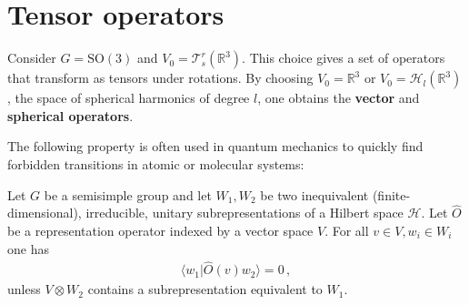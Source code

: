 \section{Tensor operators}

    \begin{example}
        Consider $G=\mathrm{SO}(3)$ and $V_0=\mathcal{T}^r_s(\mathbb{R}^3)$. This choice gives a set of operators that transform as tensors under rotations. By choosing $V_0=\mathbb{R}^3$ or $V_0=\mathcal{H}_l(\mathbb{R}^3)$, the space of spherical harmonics of degree $l$, one obtains the \textbf{vector} and \textbf{spherical operators}.
    \end{example}

    The following property is often used in quantum mechanics to quickly find forbidden transitions in atomic or molecular systems:
    \begin{property}
        Let $G$ be a semisimple group and let $W_1,W_2$ be two inequivalent (finite-dimensional), irreducible, unitary subrepresentations of a Hilbert space $\mathcal{H}$. Let $\hat{O}$ be a representation operator indexed by a vector space $V$. For all $v\in V,w_i\in W_i$ one has
        \begin{gather}
            \langle w_1|\hat{O}(v)w_2 \rangle=0\,,
        \end{gather}
        unless $V\otimes W_2$ contains a subrepresentation equivalent to $W_1$.
    \end{property}

